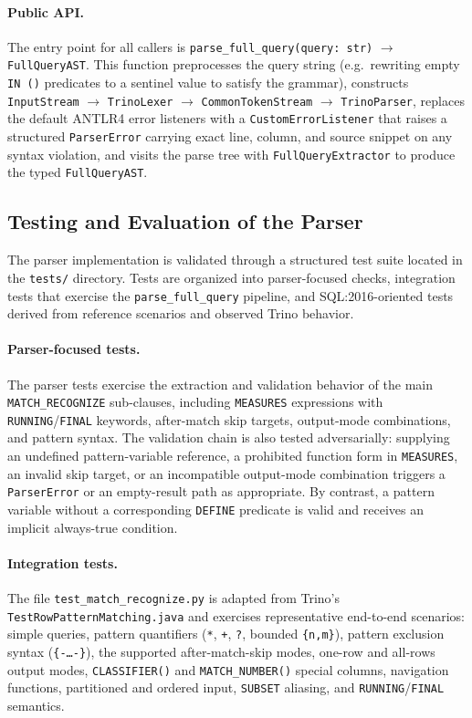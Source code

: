 \paragraph{Public API.}
The entry point for all callers is
\texttt{parse\_full\_query(query:~str)} $\to$ \texttt{FullQueryAST}.
This function preprocesses the query string
(e.g.\ rewriting empty \texttt{IN~()} predicates to a sentinel value
to satisfy the grammar), constructs
\texttt{InputStream} $\to$ \texttt{TrinoLexer} $\to$ \texttt{CommonTokenStream} $\to$ \texttt{TrinoParser},
replaces the default ANTLR4 error listeners with a
\texttt{CustomErrorListener} that raises a structured
\texttt{ParserError} carrying exact line, column, and source snippet
on any syntax violation, and visits the parse tree with
\texttt{FullQueryExtractor} to produce the typed \texttt{FullQueryAST}.

\subsection{Testing and Evaluation of the Parser}
\label{subsec:meth-parser-testing}

The parser implementation is validated through a structured test
suite located in the \texttt{tests/} directory.  Tests are organized
into parser-focused checks, integration tests that exercise the
\texttt{parse\_full\_query} pipeline, and SQL:2016-oriented tests
derived from reference scenarios and observed Trino behavior.

\paragraph{Parser-focused tests.}
The parser tests exercise the extraction and validation behavior of
the main \texttt{MATCH\_RECOGNIZE} sub-clauses, including
\texttt{MEASURES} expressions with \texttt{RUNNING}/\texttt{FINAL}
keywords, after-match skip targets, output-mode combinations, and
pattern syntax.  The validation chain is also tested
adversarially: supplying an undefined pattern-variable reference, a
prohibited function form in \texttt{MEASURES}, an invalid skip
target, or an incompatible output-mode combination triggers a
\texttt{ParserError} or an empty-result path as appropriate.  By
contrast, a pattern variable without a corresponding
\texttt{DEFINE} predicate is valid and receives an implicit
always-true condition.

\paragraph{Integration tests.}
The file \texttt{test\_match\_recognize.py} is adapted from Trino's
\texttt{TestRowPatternMatching.java} and exercises representative
end-to-end scenarios: simple queries, pattern quantifiers
(\texttt{*}, \texttt{+}, \texttt{?}, bounded \texttt{\{n,m\}}),
pattern exclusion syntax (\texttt{\{-\ldots-\}}), the supported
after-match-skip modes, one-row and all-rows output modes,
\texttt{CLASSIFIER()} and \texttt{MATCH\_NUMBER()} special columns,
navigation functions, partitioned and ordered input, \texttt{SUBSET}
aliasing, and \texttt{RUNNING}/\texttt{FINAL} semantics.

